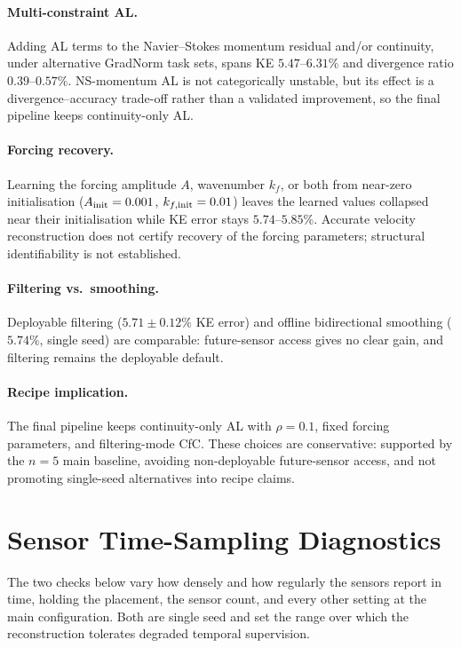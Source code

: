 \paragraph{Multi-constraint AL.}
\label{sec:multi_al_negative}
Adding AL terms to the Navier--Stokes momentum residual and/or continuity, under alternative GradNorm task sets, spans KE $5.47$--$6.31\%$ and divergence ratio $0.39$--$0.57\%$. NS-momentum AL is not categorically unstable, but its effect is a divergence--accuracy trade-off rather than a validated improvement, so the final pipeline keeps continuity-only AL.

\paragraph{Forcing recovery.}
\label{sec:forcing_identifiability}
Learning the forcing amplitude $A$, wavenumber $k_f$, or both from near-zero initialisation ($A_{\rm init}=0.001$, $k_{f,\rm init}=0.01$) leaves the learned values collapsed near their initialisation while KE error stays $5.74$--$5.85\%$. Accurate velocity reconstruction does not certify recovery of the forcing parameters; structural identifiability is not established.

\paragraph{Filtering vs.\ smoothing.}
\label{sec:filtering_smoothing}
Deployable filtering ($5.71 \pm 0.12\%$ KE error) and offline bidirectional smoothing ($5.74\%$, single seed) are comparable: future-sensor access gives no clear gain, and filtering remains the deployable default.

\paragraph{Recipe implication.}
The final pipeline keeps continuity-only AL with $\rho=0.1$, fixed forcing parameters, and filtering-mode CfC. These choices are conservative: supported by the $n=5$ main baseline, avoiding non-deployable future-sensor access, and not promoting single-seed alternatives into recipe claims.

\section{Sensor Time-Sampling Diagnostics}
\label{sec:time_sampling_diagnostics}

The two checks below vary how densely and how regularly the sensors report in time, holding the placement, the sensor count, and every other setting at the main configuration. Both are single seed and set the range over which the reconstruction tolerates degraded temporal supervision.

